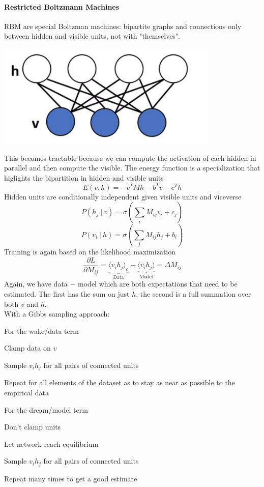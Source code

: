 \documentclass[10pt]{report}
\begin{document}
\paragraph{Restricted Boltzmann Machines} RBM are special Boltzman machines: bipartite graphs and connections only between hidden and visible units, not with "themselves".
\begin{center}
	\includegraphics[scale=0.5]{47.png}
\end{center}
This becomes tractable because we can compute the activation of each hidden in parallel and then compute the visible. The energy function is a specialization that higlights the bipartition in hidden and visible units $$E(v,h) = -v^TMh - b^Tv - c^Th$$
Hidden units are conditionally independent given visible units and viceverse
$$P(h_j\:|\:v)=\sigma\left(\sum_i M_{ij}v_i+c_j\right)$$
$$P(v_i\:|\:h)=\sigma\left(\sum_j M_{ij}h_j+b_i\right)$$
Training is again based on the likelihood maximization $$\frac{\partial L}{\partial M_{ij}} = \underset{\text{Data}}{\underbrace{\langle v_ih_j\rangle_c}} - \underset{\text{Model}}{\underbrace{\langle v_ih_j\rangle}} = \Delta M_{ij}$$
Again, we have data $-$ model which are both expectations that need to be estimated. The first has the sum on just $h$, the second is a full summation over both $v$ and $h$.\\
With a Gibbs sampling approach:
\begin{multicols}{2}
For the wake/data term\begin{list}{}{}
	\item Clamp data on $v$
	\item Sample $v_ih_j$ for all pairs of connected units
	\item Repeat for all elements of the dataset as to stay as near as possible to the empirical data
\end{list}
\columnbreak

For the dream/model term\begin{list}{}{}
	\item Don't clamp units
	\item Let network reach equilibrium
	\item Sample $v_ih_j$ for all pairs of connected units
	\item Repeat many times to get a good estimate
\end{list}
\end{multicols}
\end{document}
